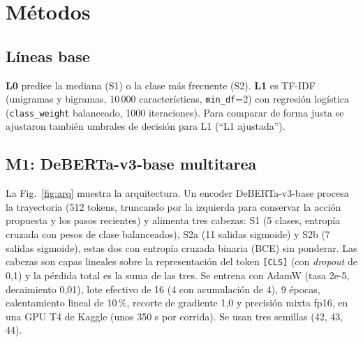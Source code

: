 \documentclass[conference]{IEEEtran}
\begin{document}
\section{Métodos}
\subsection{Líneas base}
\textbf{L0} predice la mediana (S1) o la clase más frecuente (S2). \textbf{L1} es TF-IDF (unigramas y bigramas, 10\,000 características, \texttt{min\_df}=2) con regresión logística (\texttt{class\_weight} balanceado, 1000 iteraciones). Para comparar de forma justa se ajustaron también umbrales de decisión para L1 (``L1 ajustada'').

\subsection{M1: DeBERTa-v3-base multitarea}
La Fig.~\ref{fig:arq} muestra la arquitectura. Un encoder DeBERTa-v3-base \cite{he2023} procesa la trayectoria (512 tokens, truncando por la izquierda para conservar la acción propuesta y los pasos recientes) y alimenta tres cabezas: S1 (5 clases, entropía cruzada con pesos de clase balanceados), S2a (11 salidas sigmoide) y S2b (7 salidas sigmoide), estas dos con entropía cruzada binaria (BCE) sin ponderar. Las cabezas son capas lineales sobre la representación del token \texttt{[CLS]} (con \emph{dropout} de 0,1) y la pérdida total es la suma de las tres. Se entrena con AdamW \cite{loshchilov2019} (tasa 2e-5, decaimiento 0,01), lote efectivo de 16 (4 con acumulación de 4), 9 épocas, calentamiento lineal de 10\,\%, recorte de gradiente 1,0 y precisión mixta fp16, en una GPU T4 de Kaggle (unos 350 s por corrida). Se usan tres semillas (42, 43, 44).
\end{document}
